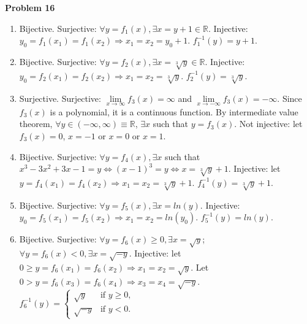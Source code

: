 \documentclass{article}
\begin{document}
\textbf{Problem 16}
\begin{enumerate}[label={(\roman*)}]
    \item Bijective. Surjective: $\forall y=f_1(x), \exists x = y +1\in \mathbb{R}$. Injective: $y_0=f_1(x_1)=f_1(x_2)\Rightarrow x_1=x_2=y_0+1$. $f_1^{-1}(y)=y+1$.
    \item Bijective. Surjective: $\forall y=f_2(x), \exists x = \sqrt[3]{y}\in \mathbb{R}$. Injective: $y_0=f_2(x_1)=f_2(x_2)\Rightarrow x_1=x_2=\sqrt[3]{y}$. $f_2^{-1}(y)=\sqrt[3]{y}$.
    \item Surjective. Surjective: $\lim\limits_{x\rightarrow \infty}f_3(x)=\infty$ and $\lim\limits_{x\rightarrow -\infty}f_3(x)=-\infty$. Since $f_3(x)$ is a polynomial, it is a continuous function. By intermediate value theorem, $\forall y  \in (-\infty,\infty)\equiv \mathbb{R}$, $\exists x$ such that $y=f_3(x)$. Not injective: let $f_3(x)=0$, $x=-1$ or $x=0$ or $x=1$. 
    \item Bijective. Surjective: $\forall y=f_4(x), \exists x$ such that $x^3-3x^2+3x-1=y \Leftrightarrow (x-1)^3=y \Leftrightarrow x=\sqrt[3]{y}+1$. Injective: let $y=f_4(x_1)=f_4(x_2)\Rightarrow x_1=x_2=\sqrt[3]{y}+1$. $f_4^{-1}(y)=\sqrt[3]{y}+1$. 
    \item Bijective. Surjective: $\forall y = f_5(x), \exists x = ln(y)$. Injective: $y_0=f_5(x_1)=f_5(x_2)\Rightarrow x_1=x_2=ln(y_0)$. $f_5^{-1}(y)=ln(y)$. 
    \item Bijective. Surjective: $\forall y = f_6(x) \ge 0, \exists x=\sqrt{y}$; $\forall y=f_6(x)<0,\exists x=\sqrt{-y}$. Injective: let $0\ge y=f_6(x_1)=f_6(x_2)\Rightarrow x_1=x_2=\sqrt{y}$. Let $0>y=f_6(x_3)=f_6(x_4)\Rightarrow x_3=x_4=\sqrt{-y}$. $f_6^{-1}(y)=\begin{cases}
        \sqrt{y} & \text{if }y\ge 0,\\
        \sqrt{-y} & \text{if }y<0.
    \end{cases}$
\end{enumerate}
\end{document}
